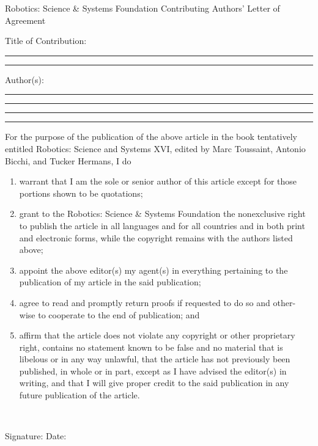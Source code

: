 \documentclass[10pt,letterpaper]{article}
\begin{document}
\thispagestyle{empty}

\vspace*{4mm}

  \begin{center}
    \LARGE
    Robotics: Science \& Systems Foundation
    Contributing Authors' Letter of Agreement
  \end{center}

\vspace*{8mm}
  
Title of Contribution:

\rule{1\columnwidth}{0.4pt}

\rule{1\columnwidth}{0.4pt}
  
Author(s):

\rule{1\columnwidth}{0.4pt}

\rule{1\columnwidth}{0.4pt}

\rule{1\columnwidth}{0.4pt}

\rule{1\columnwidth}{0.4pt}

  For the purpose of the publication of the above article in the book
  tentatively entitled Robotics: Science and Systems XVI, edited by
  Marc Toussaint, Antonio Bicchi, and Tucker Hermans, I do
  \begin{enumerate}
    \item warrant that I am the sole or senior author of this article
      except for those portions shown to be quotations;
    \item grant to the Robotics: Science \& Systems Foundation the
      nonexclusive right to publish the article in all languages and
      for all countries and in both print and electronic forms, while
      the copyright remains with the authors listed above;
    \item appoint the above editor(s) my agent(s) in everything
      pertaining to the publication of my article in the said
      publication;
    \item agree to read and promptly return proofs if requested to do
      so and other- wise to cooperate to the end of publication; and
    \item affirm that the article does not violate any copyright or
      other proprietary right, contains no statement known to be false
      and no material that is libelous or in any way unlawful, that
      the article has not previously been published, in whole or in
      part, except as I have advised the editor(s) in writing, and
      that I will give proper credit to the said publication in any
      future publication of the article.
  \end{enumerate}

  ~
  
Signature: \raisebox{-4pt}{\rule{.5\columnwidth}{0.4pt}}
\hfill%
Date: \raisebox{-4pt}{\rule{.25\columnwidth}{0.4pt}}


 
\end{document}
